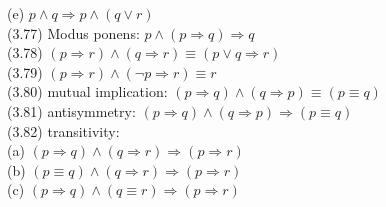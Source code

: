 \documentclass[10pt,landscape]{article}
\makeatletter
\renewcommand{\subsection}{\@startsection{subsection}{2}{0mm}%
                                {-1ex plus -.5ex minus -.2ex}%
                                {0.5ex plus .2ex}%
                                {\normalfont\small\bfseries}}
\makeatother
\begin{document}
\begin{multicols}{3}
{\qquad(e) $p\land q\Rightarrow p\land(q\lor r)$\\
(3.77) Modus ponens: $p\land (p\Rightarrow q)\Rightarrow q$\\
(3.78) $(p\Rightarrow r)\land (q\Rightarrow r)\equiv (p\lor q\Rightarrow r)$\\
(3.79) $(p\Rightarrow r)\land (\neg p\Rightarrow r)\equiv r$\\
(3.80) mutual implication: $(p\Rightarrow q)\land (q\Rightarrow p)\equiv (p\equiv q)$\\
(3.81) antisymmetry: $(p\Rightarrow q)\land(q\Rightarrow p)\Rightarrow (p\equiv q)$\\
(3.82) transitivity:\\
\qquad(a) $(p\Rightarrow q)\land (q\Rightarrow r)\Rightarrow (p\Rightarrow r)$\\
\qquad(b) $(p\equiv q)\land (q\Rightarrow r)\Rightarrow (p\Rightarrow r)$\\
\qquad(c) $(p\Rightarrow q)\land (q\equiv r)\Rightarrow (p\Rightarrow r)$


}
\end{multicols}
\end{document}
